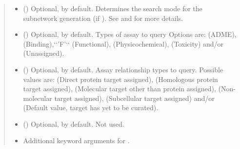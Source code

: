 \documentclass[letterpaper,10pt,english]{sphinxmanual}
\begin{document}
\begin{fulllineitems}
\begin{fulllineitems}
\begin{quote}
\begin{description}
\begin{itemize}
\item {} 
 () \textendash{} Optional,  by default. Determines the search mode
for the subnetwork generation (if ). See
{\hyperref[\detokenize{main:pypath.main.PyPath.search_attr_or}]{}} and
{\hyperref[\detokenize{main:pypath.main.PyPath.search_attr_and}]{}} for more
details.

\item {} 
 () \textendash{} Optional, \sphinxcode{\sphinxupquote{{[}'B', 'F'{]}}} by default. Types of assay to query
Options are:  (ADME),  (Binding),{}`{}`’F’{}`{}`
(Functional),  (Physicochemical),  (Toxicity)
and/or  (Unassigned).

\item {} 
 () \textendash{} Optional, \sphinxcode{\sphinxupquote{{[}'D', 'H'{]}}} by default. Assay relationship
types to query. Possible values are:  (Direct protein
target assigned),  (Homologous protein target
assigned),  (Molecular target other than protein
assigned),  (Non-molecular target assigned), 
(Subcellular target assigned) and/or  (Default value,
target has yet to be curated).

\item {} 
 () \textendash{} Optional,  by default. Not used.

\item {} 
 \textendash{} Additional keyword arguments for
.

\end{itemize}


\end{description}
\end{quote}
\end{fulllineitems}
\end{fulllineitems}
\end{document}

